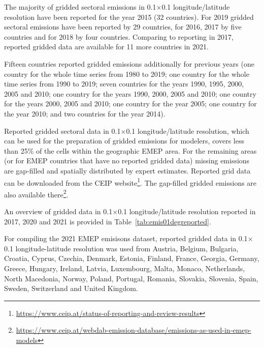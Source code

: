The majority of gridded sectoral emissions in 0.1{\degrees}$\times$0.1{\degrees} lon\-gi\-tude/la\-ti\-tude resolution have been reported for the year 2015 (32 countries). For 2019 gridded sectoral emissions have been reported by 29 countries, for 2016, 2017 by five countries and for 2018 by four countries. Comparing to reporting in 2017, reported gridded data are available for 11 more countries in 2021.

Fifteen countries reported gridded emissions additionally for previous years (one country for the whole time series from 1980 to 2019; one country for the whole time series from 1990 to 2019; seven countries for the years 1990, 1995, 2000, 2005 and 2010; one country for the years 1990, 2000, 2005 and 2010; one country for the years 2000, 2005 and 2010; one country for the year 2005; one country for the year 2010; and two countries for the year 2014).


Reported gridded sectoral data in 0.1{\degrees}$\times$0.1{{\degrees}} lon\-gi\-tude/la\-ti\-tude resolution, which can be used for the preparation of gridded emissions for modelers, covers less than 25\% of the cells within the geographic EMEP area. For the remaining areas (or for EMEP countries that have no reported gridded data) missing emissions are gap-filled and spatially distributed by expert estimates. Reported grid data can be downloaded from the CEIP website\footnote{\url{https://www.ceip.at/status-of-reporting-and-review-results}}. The gap-filled gridded emissions are also available there\footnote{\url{https://www.ceip.at/webdab-emission-database/emissions-as-used-in-emep-models}}. 

An overview of gridded data in 0.1{\degrees}$\times$0.1{{\degrees}} lon\-gi\-tude/la\-ti\-tude resolution reported in 2017, 2020 and 2021 is provided in Table~\ref{tab:emis01degreported}.





For compiling the 2021 EMEP emisisons dataset, reported gridded data in 0.1{\degrees}$\times$0.1{\degrees} longitude-latitude resolution was used from Austria, Belgium, Bulgaria, Croatia, Cyprus, Czechia, Denmark, Estonia, Finland, France, Georgia, Germany, Greece, Hungary, Ireland, Latvia, Luxembourg, Malta, Monaco, Netherlands, North Macedonia, Norway, Poland, Portugal, Romania, Slovakia, Slovenia, Spain, Sweden, Switzerland and United Kingdom.


